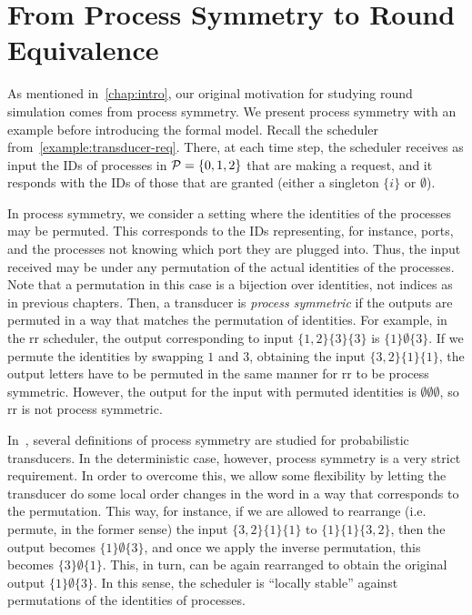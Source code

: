\chapter{From Process Symmetry to Round Equivalence}
\label{chap:application}

As mentioned in~\cref{chap:intro}, our original motivation for studying round simulation comes from process symmetry. We present process symmetry with an example before introducing the formal model.
Recall the  scheduler from~\cref{example:transducer-req}. There, at each time step, the scheduler receives as input the IDs of processes in $\mathcal{P}=\{0,1,2\}$ that are making a request, and it responds with the IDs of those that are granted (either a singleton $\{i\}$ or $\emptyset$).

In process symmetry, we consider a setting where the identities of the processes may be permuted. This corresponds to the IDs representing, for instance, ports, and the processes not knowing which port they are plugged into. Thus, the input received may be under any permutation of the actual identities of the processes. Note that a permutation in this case is a bijection over identities, not indices as in previous chapters. Then, a transducer is \emph{process symmetric} if the outputs are permuted in a way that matches the permutation of identities. For example, in the \gls{rr} scheduler, the output corresponding to input $\{1,2\}\{3\}\{3\}$ is $\{1\}\emptyset\{3\}$. If we permute the identities by swapping $1$ and $3$, obtaining the input $\{3,2\}\{1\}\{1\}$, the output letters have to be permuted in the same manner for \gls{rr} to be process symmetric. However, the output for the input with permuted identities is $\emptyset\emptyset\emptyset$, so \gls{rr} is not process symmetric.

In~\cite{Almagor2020b}, several definitions of process symmetry are studied for probabilistic transducers. In the deterministic case, however, process symmetry is a very strict requirement. In order to overcome this, we allow some flexibility by letting the transducer do some local order changes in the word in a way that corresponds to the permutation. This way, for instance, if we are allowed to rearrange (i.e. permute, in the former sense) the input $\{3,2\}\{1\}\{1\}$ to $\{1\}\{1\}\{3,2\}$, then the output becomes $\{1\}\emptyset\{3\}$, and once we apply the inverse permutation, this becomes $\{3\}\emptyset\{1\}$. This, in turn, can be again rearranged to obtain the original output $\{1\}\emptyset\{3\}$.
In this sense, the scheduler is ``locally stable'' against permutations of the identities of processes.

